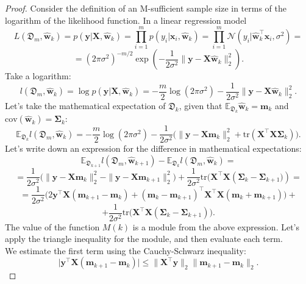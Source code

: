 \documentclass[runningheads]{llncs}
\begin{document}
\begin{proof}
Consider the definition of an M-sufficient sample size in terms of the logarithm of the likelihood function. In a linear regression model
    \[ L\left( \mathfrak{D}_m, \hat{\mathbf{w}}_k \right) = p(\mathbf{y} | \mathbf{X}, \hat{\mathbf{w}}_k) = \prod_{i=1}^{m} p(y_i | \mathbf{x}_i, \hat{\mathbf{w}}_k) = \prod_{i=1}^{m} \mathcal{N}\left( y_i | \hat{\mathbf{w}}_k^{\top} \mathbf{x}_i, \sigma^2 \right) = \]
    \[= \left(2\pi\sigma^2 \right)^{-m/2} \exp\left(-\dfrac{1}{2\sigma^2}\|\mathbf{y} -\mathbf{X} \hat{\mathbf{w}}_k\|_2^2 \right). \]
Take a logarithm:
    \[ l\left( \mathfrak{D}_m, \hat{\mathbf{w}}_k \right) = \log p(\mathbf{y} | \mathbf{X}, \hat{\mathbf{w}}_k) = -\dfrac{m}{2}\log\left( 2\pi\sigma^2 \right) - \dfrac{1}{2\sigma^2} \| \mathbf{y} - \mathbf{X} \hat{\mathbf{w}}_k \|_2^2. \]
Let's take the mathematical expectation of $\mathfrak{D}_k$, given that $\mathbb{E}_{\mathfrak{D}_k}\hat{\mathbf{w}}_k=\mathbf{m}_k$ and $\text{cov}(\hat{\mathbf{w}}_k) = \mathbf{\Sigma}_k$:
    \[ \mathbb{E}_{\mathfrak{D}_k} l\left( \mathfrak{D}_m, \hat{\mathbf{w}}_k \right) = -\dfrac{m}{2}\log\left( 2\pi\sigma^2 \right) - \dfrac{1}{2\sigma^2} \Big( \| \mathbf{y} - \mathbf{X} \mathbf{m}_k \|_2^2 + \text{tr}\left( \mathbf{X}^{\top}\mathbf{X} \mathbf{\Sigma}_k \right) \Big). \]
    Let's write down an expression for the difference in mathematical expectations:
    \[ \mathbb{E}_{\mathfrak{D}_{k+1}} l(\mathfrak{D}_m, \hat{\mathbf{w}}_{k+1}) - \mathbb{E}_{\mathfrak{D}_k} l(\mathfrak{D}_m, \hat{\mathbf{w}}_{k}) = \]
    \[ = \dfrac{1}{2\sigma^2} \Big( \| \mathbf{y} - \mathbf{X} \mathbf{m}_k \|_2^2 - \| \mathbf{y} - \mathbf{X} \mathbf{m}_{k+1} \|_2^2 \Big) + \dfrac{1}{2\sigma^2} \text{tr} \Big( \mathbf{X}^{\top}\mathbf{X} \left( \mathbf{\Sigma}_k - \mathbf{\Sigma}_{k+1} \Big) \right) = \]
    \[ = \dfrac{1}{2\sigma^2} \Big( 2 \mathbf{y}^{\top} \mathbf{X} (\mathbf{m}_{k+1} - \mathbf{m}_k) + (\mathbf{m}_k - \mathbf{m}_{k+1})^{\top} \mathbf{X}^{\top}\mathbf{X} (\mathbf{m}_k + \mathbf{m}_{k+1}) \Big) + \]
    \[ + \dfrac{1}{2\sigma^2} \text{tr} \Big( \mathbf{X}^{\top}\mathbf{X} \left( \mathbf{\Sigma}_k - \mathbf{\Sigma}_{k+1} \right) \Big). \]
The value of the function $M(k)$ is a module from the above expression. Let's apply the triangle inequality for the module, and then evaluate each term.\\
We estimate the first term using the Cauchy-Schwarz inequality:
\[\big| \mathbf{y}^{\top}\mathbf{X}(\mathbf{m}_{k+1}-\mathbf{m}_k)\big| \leqslant \| \mathbf{X}^{\top}\mathbf{y} \|_2 \|\mathbf{m}_{k+1} - \mathbf{m}_k\|_2. \]

\end{proof}
\end{document}
